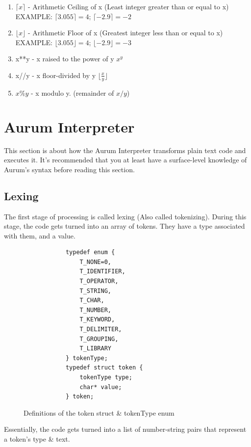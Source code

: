\documentclass[12pt, letterpaper, oneside]{article}
\begin{document}
\begin{enumerate}
		\item $\lceil x \rceil$ - Arithmetic Ceiling of x (Least integer greater than or equal to x)
		\newline
		EXAMPLE: $\lceil 3.055 \rceil = 4$; $\lceil -2.9 \rceil = -2$ 
		\item $\lfloor x \rfloor$ - Arithmetic Floor of x (Greatest integer less than or equal to x)
		\newline
		EXAMPLE: $\lfloor 3.055 \rfloor = 4$; $\lfloor -2.9 \rfloor = -3$ 
		\item x**y - x raised to the power of y $x^y$
		\item x//y - x floor-divided by y $\lfloor \frac{x}{y} \rfloor$
		\item $x\%y$ - x modulo y. (remainder of $x/y$)
	\end{enumerate}
	\newpage
	\section{Aurum Interpreter}
	This section is about how the Aurum Interpreter transforms plain text code and executes it. It's recommended that you at least have a surface-level knowledge of Aurum's syntax before reading this section.
	\subsection{Lexing}
	The first stage of processing is called lexing (Also called tokenizing). During this stage, the code gets turned into an array of tokens. They have a type associated with them, and a value.
	\begin{figure}[h]
		\centering
		\begin{verbatim}
			typedef enum {
				T_NONE=0,
				T_IDENTIFIER,
				T_OPERATOR,
				T_STRING,
				T_CHAR,
				T_NUMBER,
				T_KEYWORD,
				T_DELIMITER,
				T_GROUPING,
				T_LIBRARY
			} tokenType;
			typedef struct token {
				tokenType type;
				char* value;
			} token;
		\end{verbatim}
		\caption{Definitions of the token struct \& tokenType enum}
	\end{figure} \newline
	Essentially, the code gets turned into a list of number-string pairs that represent a token's type \& text.
	\newpage
\end{document}
